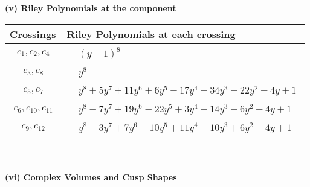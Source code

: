 \documentclass[1p]{elsarticle_modified}
\theoremstyle{definition}
\begin{document}
\newpage\renewcommand{\arraystretch}{1}
\flushleft \textbf{(v) Riley Polynomials at the component}\newline \\
\begin{tabular}{m{50pt}|m{274pt}}
Crossings & \hspace{64pt}Riley Polynomials at each crossing \\
\hline $$\begin{aligned}c_{1},c_{2},c_{4}\end{aligned}$$&$\begin{aligned}
&(y-1)^8
\end{aligned}$\\
\hline $$\begin{aligned}c_{3},c_{8}\end{aligned}$$&$\begin{aligned}
&y^8
\end{aligned}$\\
\hline $$\begin{aligned}c_{5},c_{7}\end{aligned}$$&$\begin{aligned}
&y^8+5 y^7+11 y^6+6 y^5-17 y^4-34 y^3-22 y^2-4 y+1
\end{aligned}$\\
\hline $$\begin{aligned}c_{6},c_{10},c_{11}\end{aligned}$$&$\begin{aligned}
&y^8-7 y^7+19 y^6-22 y^5+3 y^4+14 y^3-6 y^2-4 y+1
\end{aligned}$\\
\hline $$\begin{aligned}c_{9},c_{12}\end{aligned}$$&$\begin{aligned}
&y^8-3 y^7+7 y^6-10 y^5+11 y^4-10 y^3+6 y^2-4 y+1
\end{aligned}$\\
\hline
\end{tabular}\\~\\
\newpage\flushleft \textbf{(vi) Complex Volumes and Cusp Shapes}
\end{document}
